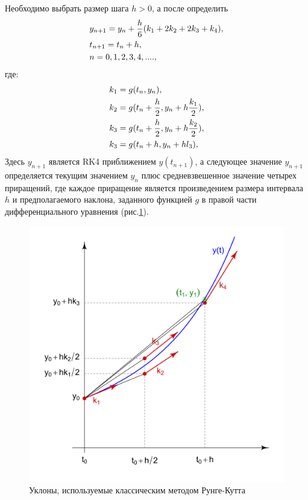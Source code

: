 \documentclass[a4paper,12pt]{article}
\begin{document}
	Необходимо выбрать размер шага \(h>0\), а после определить
	\begin{equation}\label{eq:2} 
		\begin{lgathered}
			y_{n+1}=y_n+\frac{h}{6}(k_1+2k_2+2k_3+k_4),\\
			t_{n+1}=t_n+h,\\
			n=0, 1, 2, 3, 4, ....,\\
		\end{lgathered}
	\end{equation}
	где:    
	\begin{equation}\label{eq:2} 
		\begin{lgathered} 
			k_1=g(t_n, y_n),\\
			k_2=g(t_n+\frac{h}{2}, y_n+h\frac{k_1}{2}),\\
			k_3=g(t_n+\frac{h}{2}, y_n+h\frac{k_2}{2}),\\
			k_3=g(t_n+h, y_n+hl_3),\\
		\end{lgathered}
	\end{equation}
	Здесь \(y_{n+1}\) является RK4 приближением \(y(t_{n+1})\), а следующее значение \(y_{n+1}\) определяется текущим значением \(y_n\) плюс средневзвешенное значение четырех приращений, где каждое приращение является произведением размера интервала \(h\) и предполагаемого наклона, заданного функцией \(g\) в правой части дифференциального уравнения (рис.\ref{fig:magnus}).
	\begin{figure}[htb]
		\centering%
		\includegraphics[width=0.8\linewidth]{Ruhgy_koef}
		\caption{\label{fig:magnus}Уклоны, используемые классическим методом Рунге-Кутта}
	\end{figure}
	
\end{document}
